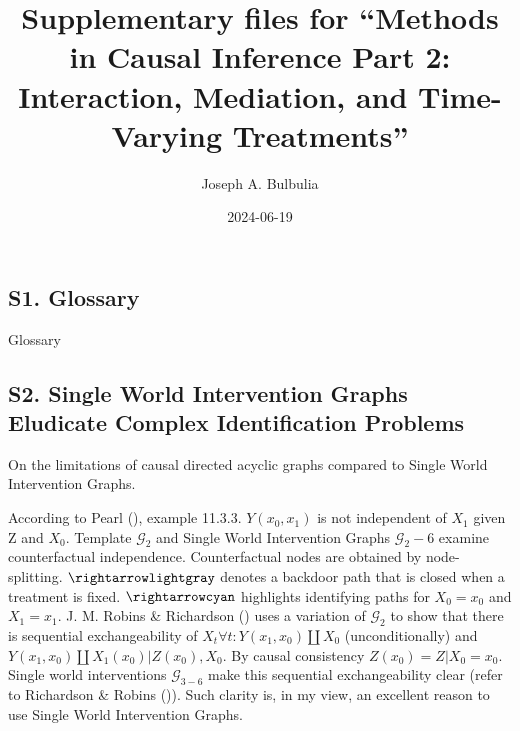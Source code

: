\documentclass[
  single column]{article}
\title{Supplementary files for ``Methods in Causal Inference Part 2:
Interaction, Mediation, and Time-Varying Treatments''}
\author{Joseph A. Bulbulia}
\affil{%
             \small{     Victoria University of Wellington, New Zealand
          ORCID \textcolor[HTML]{A6CE39}{\aiOrcid} ~0000-0002-5861-2056 }
              }
\date{2024-06-19}
\renewcommand*\contentsname{Table of contents}
\newcommand\contentsname{Table of contents}
\begin{document}
\maketitle

\renewcommand*\contentsname{Table of contents}
{
\hypersetup{linkcolor=}
\setcounter{tocdepth}{2}
\tableofcontents
}
\listoftables
\newpage{}

\subsection{S1. Glossary}\label{id-app-a}

\begin{table}

\caption{\label{tbl-experiments}Glossary}

\centering{

\glossaryTerms

}

\end{table}%

\newpage{}

\subsection{S2. Single World Intervention Graphs Eludicate Complex
Identification Problems}\label{id-app-b}

\begin{table}

\caption{\label{tbl-pearltable}On the limitations of causal directed
acyclic graphs compared to Single World Intervention Graphs.}

\centering{

\pearltable

}

\end{table}%

According to Pearl (), example 11.3.3.
\(Y(x_0, x_1)\) is not independent of \(X_1\) given Z and \(X_0\).
Template \(\mathcal{G}_2\) and Single World Intervention Graphs
\(\mathcal{G}_2-6\) examine counterfactual independence. Counterfactual
nodes are obtained by node-splitting. \(\rightarrowlightgray\) denotes a
backdoor path that is closed when a treatment is fixed.
\(\rightarrowcyan\) highlights identifying paths for \(X_0 = x_0\) and
\(X_1 = x_1\). J. M. Robins \& Richardson
() uses a variation of
\(\mathcal{G}_2\) to show that there is sequential exchangeability of
\(X_t \forall t: Y(x_1, x_0)\coprod X_0\) (unconditionally) and
\(Y(x_1, x_0)\coprod X_1(x_0) | Z(x_0), X_0\). By causal consistency
\(Z(x_0) = Z|X_0 = x_0\). Single world interventions
\(\mathcal{G}_{3-6}\) make this sequential exchangeability clear (refer
to Richardson \& Robins ()). Such
clarity is, in my view, an excellent reason to use Single World
Intervention Graphs.
\end{document}
